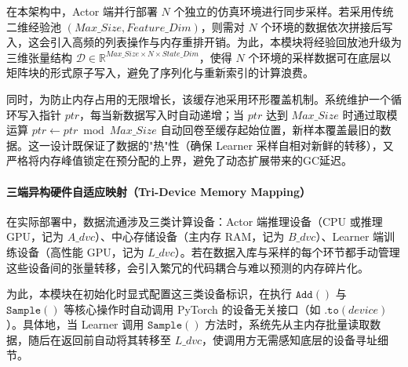 \documentclass[
  oneside,
  degree=bachelor,
  fullwidthstop=false,
  fontset=fandol,
  times=false,
  minted=true,
  biblatex=true,
]{tongjithesis}
\begin{document}
在本架构中，Actor 端并行部署 $N$ 个独立的仿真环境进行同步采样。若采用传统二维经验池 $(Max\_Size, Feature\_Dim)$，则需对 $N$ 个环境的数据依次拼接后写入，这会引入高频的列表操作与内存重排开销。为此，本模块将经验回放池升级为三维张量结构 $\mathcal{D} \in \mathbb{R}^{Max\_Size \times N \times State\_Dim}$，使得 $N$ 个环境的采样数据可在底层以矩阵块的形式原子写入，避免了序列化与重新索引的计算浪费。

同时，为防止内存占用的无限增长，该缓存池采用环形覆盖机制。系统维护一个循环写入指针 $ptr$，每当新数据写入时自动递增；当 $ptr$ 达到 $Max\_Size$ 时通过取模运算 $ptr \leftarrow ptr \bmod Max\_Size$ 自动回卷至缓存起始位置，新样本覆盖最旧的数据。这一设计既保证了数据的"热"性（确保 Learner 采样自相对新鲜的转移），又严格将内存峰值锁定在预分配的上界，避免了动态扩展带来的GC延迟。

\paragraph{三端异构硬件自适应映射（Tri-Device Memory Mapping）}

在实际部署中，数据流通涉及三类计算设备：Actor 端推理设备（CPU 或推理 GPU，记为 $A\_dvc$）、中心存储设备（主内存 RAM，记为 $B\_dvc$）、Learner 端训练设备（高性能 GPU，记为 $L\_dvc$）。若在数据入库与采样的每个环节都手动管理这些设备间的张量转移，会引入繁冗的代码耦合与难以预测的内存碎片化。

为此，本模块在初始化时显式配置这三类设备标识，在执行 $\texttt{Add}()$ 与 $\texttt{Sample}()$ 等核心操作时自动调用 PyTorch 的设备无关接口（如 $\texttt{.to}(device)$）。具体地，当 Learner 调用 $\texttt{Sample}()$ 方法时，系统先从主内存批量读取数据，随后在返回前自动将其转移至 $L\_dvc$，使调用方无需感知底层的设备寻址细节。
\end{document}
